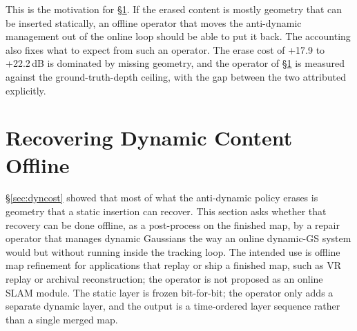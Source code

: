 \documentclass[10pt,twocolumn,letterpaper]{article}
\newcommand{\gate}[1]{{#1}} %
\begin{document}


This is the motivation for \S\ref{sec:offline}. If the erased content is mostly
geometry that can be inserted statically, an offline operator that moves the
anti-dynamic management out of the online loop should be able to put it back. The accounting also
fixes what to expect from such an operator. The erase cost of
\gate{+17.9} to \gate{+22.2}\,dB is dominated by missing geometry, and the operator
of \S\ref{sec:offline} is measured against the ground-truth-depth ceiling, with the gap
between the two attributed explicitly. %

\section{Recovering Dynamic Content Offline}
\label{sec:offline}

\S\ref{sec:dyncost} showed that most of what the anti-dynamic policy erases is
geometry that a static insertion can recover. This section asks whether that recovery
can be done offline, as a post-process on the finished map, by a repair operator that
manages dynamic Gaussians the way an online dynamic-GS system would
\cite{DynaGSLAM} but without running inside the tracking loop. The intended use is
offline map refinement for applications that replay or ship a finished map, such as
VR replay or archival reconstruction; the operator is not proposed as an online SLAM
module. The static layer is
frozen bit-for-bit; the operator only adds a separate dynamic layer, and the output is
a time-ordered layer sequence rather than a single merged map.
\end{document}
